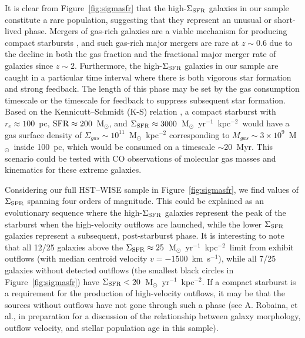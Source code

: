 \documentclass[12pt,preprint]{aastex}
\newcommand{\kms}{km~s$^{-1}$}
\newcommand{\msun}{M$_{\odot}$}
\newcommand{\units}{M$_{\odot}$~yr$^{-1}$~kpc$^{-2}$}
\newcommand{\sigmasfr}{\Sigma_{\textnormal{\scriptsize{SFR}}}}
\begin{document}
It is clear from Figure~\ref{fig:sigmasfr} that the high-$\sigmasfr$
galaxies in our sample constitute a rare population, suggesting that
they represent an unusual or short-lived phase.  Mergers of gas-rich
galaxies are a viable mechanism for producing compact starbursts
\citep{mih96}, and such gas-rich major mergers are rare at $z\sim0.6$
due to the decline in both the gas fraction \citep{tac10} and the
fractional major merger rate \citep{lot11} of galaxies since $z\sim2$.
Furthermore, the high-$\sigmasfr$ galaxies in our sample are caught in
a particular time interval where there is both vigorous star formation
and strong feedback.  The length of this phase may be set by the gas
consumption timescale or the timescale for feedback to suppress
subsequent star formation.  Based on the Kennicutt--Schmidt (K-S)
relation \citep{ken98}, a compact starburst with $r_e\approx100$~pc,
$\textnormal{SFR}\approx200$~\msun, and
$\sigmasfr\approx3000$~\units\ would have a gas surface density of
$\Sigma_{gas}\sim10^{11}$~\msun~kpc$^{-2}$ corresponding to
$M_{gas}\sim3\times10^{9}$~\msun\ inside 100~pc, which would be
consumed on a timescale $\sim20$~Myr.  This scenario could be tested
with CO observations of molecular gas masses and kinematics for these
extreme galaxies.


Considering our full HST--WISE sample in Figure~\ref{fig:sigmasfr}, we
find values of $\sigmasfr$ spanning four orders of magnitude.  This
could be explained as an evolutionary sequence where the
high-$\sigmasfr$ galaxies represent the peak of the starburst when the
high-velocity outflows are launched, while the lower $\sigmasfr$
galaxies represent a subsequent, post-starburst phase.  It is
interesting to note that all 12/25 galaxies above the
$\sigmasfr\approx25$~\units\ limit from \citet{meu97} exhibit outflows
(with median centroid velocity $v=-1500$~\kms), while all 7/25
galaxies without detected outflows (the smallest black circles in
Figure~\ref{fig:sigmasfr}) have $\sigmasfr<20$~\units.  If a compact
starburst is a requirement for the production of high-velocity
outflows, it may be that the sources without outflows have not gone
through such a phase (see A. Robaina, et al., in preparation for a
discussion of the relationship between galaxy morphology, outflow
velocity, and stellar population age in this sample).
\end{document}
